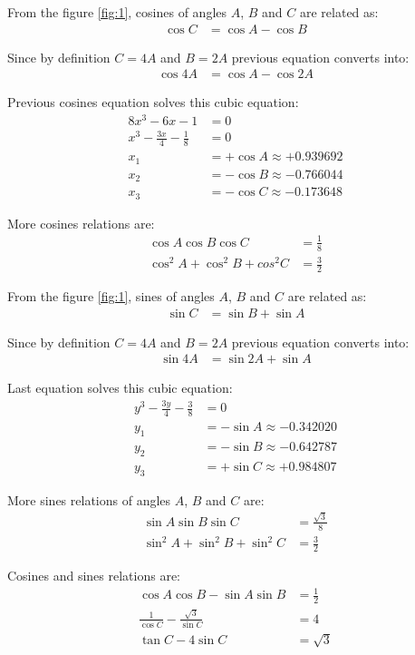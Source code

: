 \documentclass[11pt]{article}
\begin{document}
From the figure \ref{fig:1}, cosines of angles $A$, $B$ and $C$ are related as:
\begin{align*}
\cos{C} &= \cos{A} - \cos{B}
\end{align*}

Since by definition $C=4A$ and $B=2A$ previous equation converts into:
\begin{align*}
\cos{4A} &= \cos{A} - \cos{2A}
\end{align*}

Previous cosines equation solves this cubic equation:
\begin{align*}
8x^3 - 6x - 1 &= 0\\
x^3 - \frac{3x}{4} - \frac{1}{8} &= 0\\
x_1 &= +\cos{A} \approx +0.939692 \\
x_2 &= -\cos{B} \approx -0.766044 \\
x_3 &= -\cos{C} \approx -0.173648
\end{align*}

More cosines relations are:
\begin{align*}
\cos{A}\cos{B}\cos{C} &= \frac{1}{8} \\
\cos^2{A} + \cos^2{B} + cos^2{C} &= \frac{3}{2}
\end{align*}

From the figure \ref{fig:1}, sines of angles $A$, $B$ and $C$ are related as:
\begin{align*}
\sin{C} &= \sin{B} + \sin{A}
\end{align*}

Since by definition $C=4A$ and $B=2A$ previous equation converts into:
\begin{align*}
\sin{4A} &= \sin{2A} + \sin{A}
\end{align*}

Last equation solves this cubic equation:
\begin{align*}
y^3 - \frac{3y}{4} - \frac{3}{8} &= 0\\
y_1 &= -\sin{A} \approx -0.342020\\
y_2 &= -\sin{B} \approx -0.642787\\
y_3 &= +\sin{C} \approx +0.984807
\end{align*}

More sines relations of angles $A$, $B$ and $C$ are:
\begin{align*}
\sin{A}\sin{B}\sin{C} &= \frac{\sqrt{3}}{8}\\
\sin^2{A} + \sin^2{B} + \sin^2{C} &= \frac{3}{2}
\end{align*}

Cosines and sines relations are:
\begin{align*}
\cos{A}\cos{B} - \sin{A}\sin{B} &= \frac{1}{2}\\
\frac{1}{\cos{C}} -\frac{\sqrt{3}}{\sin{C}} &= 4\\
\tan{C} - 4\sin{C} &= \sqrt{3}
\end{align*}
\end{document}
